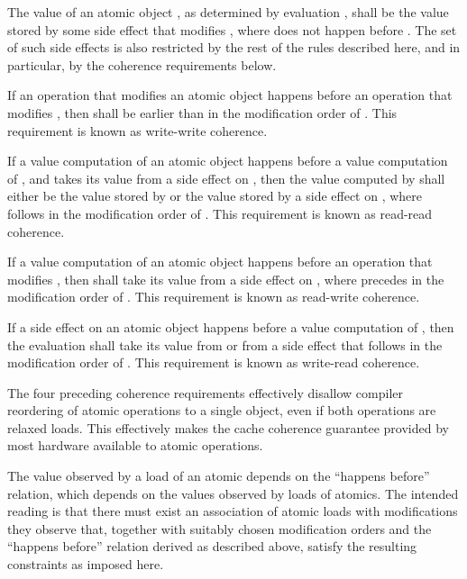 \pnum
The value of an
atomic object , as determined by evaluation , shall be the value
stored by some
side effect  that modifies , where  does not happen
before .
\enternote
The set of such side effects is also restricted by the rest of the rules
described here, and in particular, by the coherence requirements below.
\exitnote

\pnum
If an operation  that modifies an atomic object  happens before
an operation  that modifies , then  shall be earlier
than  in the modification order of . \enternote This requirement
is known as write-write coherence. \exitnote

\pnum
If a
%
value computation  of an atomic object  happens before a
value computation  of , and  takes its value from a side
effect  on , then the value computed by  shall either be
the value stored by  or the value stored by a
%
side effect  on
, where  follows  in the modification order of .
\enternote This requirement is known as read-read coherence. \exitnote

\pnum
If a
%
value computation  of an atomic object  happens before an
operation  that modifies , then  shall take its value from a side
effect  on , where  precedes  in the
modification order of . \enternote This requirement is known as
read-write coherence. \exitnote

\pnum
If a
%
side effect  on an atomic object  happens before a value
computation  of , then the evaluation  shall take its
value from  or from a
%
side effect  that follows  in the
modification order of . \enternote This requirement is known as
write-read coherence. \exitnote

\pnum
\enternote The four preceding coherence requirements effectively disallow
compiler reordering of atomic operations to a single object, even if both
operations are relaxed loads. This effectively makes the cache coherence
guarantee provided by most hardware available to \Cpp atomic operations.
\exitnote

\pnum
\enternote The value observed by a load of an atomic depends on the ``happens
before'' relation, which depends on the values observed by loads of atomics.
The intended reading is that there must exist an
association of atomic loads with modifications they observe that, together with
suitably chosen modification orders and the ``happens before'' relation derived
as described above, satisfy the resulting constraints as imposed here. \exitnote

